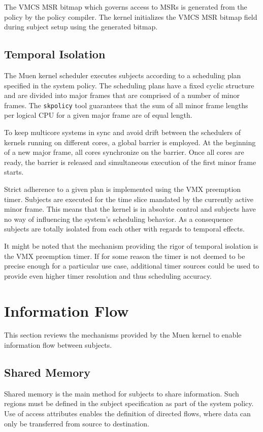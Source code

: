 The VMCS MSR bitmap which governs access to MSRs is generated from the policy by
the policy compiler. The kernel initializes the VMCS MSR bitmap field during
subject setup using the generated bitmap.

\subsection{Temporal Isolation}\label{subsec:temp-isolation}
The Muen kernel scheduler executes subjects according to a scheduling plan
specified in the system policy. The scheduling plans have a fixed cyclic
structure and are divided into major frames that are comprised of a number of
minor frames. The \texttt{skpolicy} tool guarantees that the sum of all minor
frame lengths per logical CPU for a given major frame are of equal length.

To keep multicore systems in sync and avoid drift between the schedulers of
kernels running on different cores, a global barrier is employed. At the
beginning of a new major frame, all cores synchronize on the barrier. Once all
cores are ready, the barrier is released and simultaneous execution of the
first minor frame starts.

Strict adherence to a given plan is implemented using the VMX preemption timer.
Subjects are executed for the time slice mandated by the currently active minor
frame. This means that the kernel is in absolute control and subjects have no
way of influencing the system's scheduling behavior. As a consequence subjects
are totally isolated from each other with regards to temporal effects.

It might be noted that the mechanism providing the rigor of temporal isolation
is the VMX preemption timer. If for some reason the timer is not deemed to be
precise enough for a particular use case, additional timer sources could be used
to provide even higher timer resolution and thus scheduling accuracy.

\section{Information Flow}\label{sec:information-flow}
This section reviews the mechanisms provided by the Muen kernel to enable
information flow between subjects.

\subsection{Shared Memory}
Shared memory is the main method for subjects to share information. Such regions
must be defined in the subject specification as part of the system policy. Use of
access attributes enables the definition of directed flows, where data can only
be transferred from source to destination.


